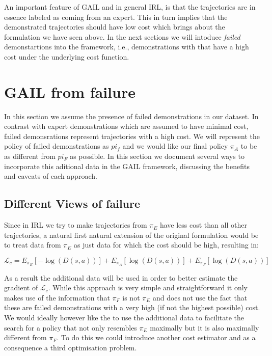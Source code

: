 \documentclass[letterpaper, 10 pt, conference]{ieeeconf}
\begin{document}
An important feature of GAIL and in general IRL, is that the trajectories are in essence labeled as coming from an expert. This in turn implies that the demonstrated trajectories should have low cost which brings about the formulation we have seen above. In the next sections we will intoduce \emph{failed} demonstartions into the framework, i.e., demonstrations with that have a high cost under the underlying cost function.

\section{GAIL from failure}
In this section we assume the presence of failed demonstrations in our dataset. In contrast with expert demonstrations which are assumed to have minimal cost, failed demonsrations represent trajectories with a high cost. We will represent the policy of failed demonstrations as $pi_f$ and we would like our final policy $\pi_A$ to be as different from $pi_F$ as possible. In this section we document several ways to incorporate this aditional data in the GAIL framework, discussing the benefits and caveats of each approach.

\subsection{Different Views of failure}
Since in IRL we try to make trajectories from $\pi_{E}$ have less cost than all other trajectories, a natural first natural extension of the original formulation would be to treat data from $\pi_{E}$  as just data for which the cost should be high, resulting in:

\begin{equation}
  \mathcal{L}_c = E_{\pi_E}[-\log(D(s,a))] + E_{\pi_A}[\log(D(s,a))] + E_{\pi_F}[\log(D(s,a))] \label{eq:LCf}
\end{equation}

As a result the additional data will be used in order to better estimate the gradient of $\mathcal{L}_c$. While this approach is very simple and straightforward it only makes use of the information that $\pi_F$ is not $\pi_E$ and does not use the fact that these are failed demonstrations with a very high (if not the highest possible) cost. We would ideally however like the to use the additional data to facilitate the search for a policy that not only resembles $\pi_E$ maximally but it is also maximally different from $\pi_F$. To do this we could introduce another cost estimator and as a consequence a third optimisation problem.
\end{document}
